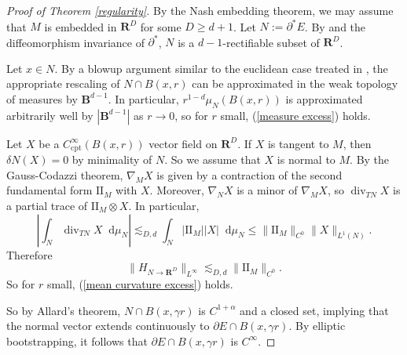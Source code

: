 \documentclass[reqno,11pt]{amsart}
\newcommand{\RR}{\mathbf{R}}
\newcommand{\Ball}{\mathbf{B}}
\newcommand*\dif{\mathop{}\!\mathrm{d}}
\newcommand{\Two}{\mathrm{I\!I}}
\DeclareMathOperator{\Div}{div}
\newcommand{\cpt}{\mathrm{cpt}}
\theoremstyle{definition}
\numberwithin{equation}{section}
\begin{document}
\begin{proof}[Proof of Theorem \ref{regularity}]
By the Nash embedding theorem, we may assume that $M$ is embedded in $\RR^D$ for some $D \geq d + 1$.
Let $N := \partial^* E$. 
By \cite[Theorem 4.11]{Giusti77} and the diffeomorphism invariance of $\partial^*$, $N$ is a $d - 1$-rectifiable subset of $\RR^D$.

Let $x \in N$. By a blowup argument similar to the euclidean case treated in \cite[Chapters 9-10]{Giusti77}, the appropriate rescaling of $N \cap B(x, r)$ can be approximated in the weak topology of measures by $\Ball^{d - 1}$.
In particular, $r^{1 - d} \mu_N(B(x, r))$ is approximated arbitrarily well by $|\Ball^{d - 1}|$ as $r \to 0$, so for $r$ small, (\ref{measure excess}) holds.

Let $X$ be a $C^\infty_\cpt(B(x, r))$ vector field on $\RR^D$.
If $X$ is tangent to $M$, then $\delta N(X) = 0$ by minimality of $N$.
So we assume that $X$ is normal to $M$.
By the Gauss-Codazzi theorem, $\nabla_M X$ is given by a contraction of the second fundamental form $\Two_M$ with $X$.
Moreover, $\nabla_N X$ is a minor of $\nabla_M X$, so $\Div_{TN} X$ is a partial trace of $\Two_M \otimes X$.
In particular,
$$\left|\int_N \Div_{TN} X \dif \mu_N\right| \lesssim_{D, d} \int_N |\Two_M| |X| \dif \mu_N \leq \|\Two_M\|_{C^0} \|X\|_{L^1(N)}.$$
Therefore 
$$\|H_{N \to \RR^D}\|_{L^\infty} \lesssim_{D, d} \|\Two_M\|_{C^0}.$$
So for $r$ small, (\ref{mean curvature excess}) holds.

So by Allard's theorem, $N \cap B(x, \gamma r)$ is $C^{1 + \alpha}$ and a closed set, implying that the normal vector extends continuously to $\partial E \cap B(x, \gamma r)$.
By elliptic bootstrapping, it follows that $\partial E \cap B(x, \gamma r)$ is $C^\infty$.
\end{proof}

\end{document}
